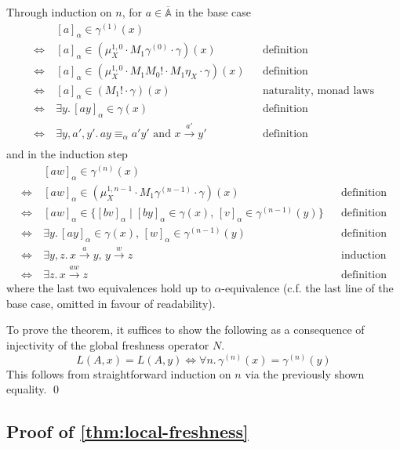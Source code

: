 \documentclass[11pt,a4paper]{amsart}
\newcommand{\Names}{\mathbb{A}}
\newcommand{\barNames}{\overline{\Names}}
\newcommand{\alphaeq}{\equiv_\alpha}
\theoremstyle{plain}
\numberwithin{equation}{section}
\newcommand{\+}[1]{\mathcal{#1}\xspace}
\theoremstyle{definition}
\begin{document}
\noindent
Through induction on $n$, for $a \in \barNames$ in the base case
\begin{align*}
    &[a]_\alpha \in \gamma^{(1)}(x) \\
    \Leftrightarrow~&[a]_\alpha \in (\mu^{1,0}_X \cdot M_1\gamma^{(0)} \cdot \gamma)(x) && \text{definition} \\
    \Leftrightarrow~&[a]_\alpha \in (\mu^{1,0}_X \cdot M_1M_0! \cdot M_1\eta_X \cdot \gamma)(x) && \text{definition} \\
    \Leftrightarrow~&[a]_\alpha \in (M_1! \cdot \gamma)(x) && \text{naturality, monad laws} \\
    \Leftrightarrow~&\exists y.\, [ay]_\alpha \in \gamma(x) && \text{definition} \\
    \Leftrightarrow~&\exists y,a',y'.\, ay \alphaeq a'y' \text{ and } x \xrightarrow{a'} y' && \text{definition}\\
\end{align*}
and in the induction step
\begin{align*}
    &[aw]_\alpha \in \gamma^{(n)}(x) \\
    \Leftrightarrow~&[aw]_\alpha \in (\mu^{1,n-1}_X \cdot M_1\gamma^{(n-1)} \cdot \gamma)(x) && \text{definition} \\
    \Leftrightarrow~&[aw]_\alpha \in \{[bv]_\alpha \mid [by]_\alpha \in \gamma(x),\, [v]_\alpha \in \gamma^{(n-1)}(y)\}&& \text{definition} \\
    \Leftrightarrow~&\exists y.\, [ay]_\alpha \in \gamma(x),\, [w]_\alpha \in \gamma^{(n-1)}(y)&& \text{definition} \\
    \Leftrightarrow~&\exists y,z.\, x \xrightarrow{a} y,\, y \xrightarrow{w} z && \text{induction} \\
    \Leftrightarrow~&\exists z.\, x \xrightarrow{aw} z && \text{definition}
\end{align*}
where the last two equivalences hold up to $\alpha$-equivalence (c.f. the last line of the base case, omitted in favour of readability).

To prove the theorem, it suffices to show the following as a consequence of injectivity of the global freshness operator $N$.
\begin{equation*}
  L(A,x) = L(A,y) \Leftrightarrow \forall n.\,\gamma^{(n)}(x) = \gamma^{(n)}(y)
\end{equation*}
This follows from straightforward induction on $n$ via the previously shown equality.
\qed

\subsection*{Proof of \cref{thm:local-freshness}}
\end{document}
